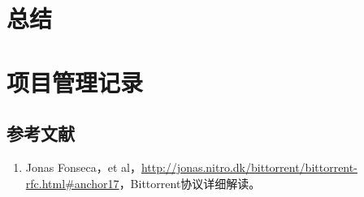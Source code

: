\documentclass[15pt]{ctexart}
\begin{document}

    \section{总结} %
    \label{sec:总结}
    
   
   \section{项目管理记录} %
   \label{sec:项目管理记录}
   

    \newpage
    \appendixpage
    \begin{appendices}
        \section{参考文献} %
            \begin{enumerate}
            	\item 	Jonas Fonseca，et al，\url{http://jonas.nitro.dk/bittorrent/bittorrent-rfc.html#anchor17}，Bittorrent协议详细解读。
            \end{enumerate}
    \end{appendices}
\end{document}

